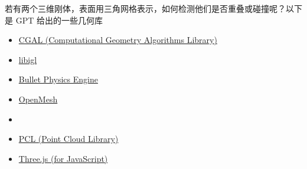 

\begin{issues}
\issueDraft
\end{issues}

若有两个三维刚体，表面用三角网格表示，如何检测他们是否重叠或碰撞呢？以下是 GPT 给出的一些几何库

\begin{itemize}
\item \href{https://www.cgal.org/}{CGAL (Computational Geometry Algorithms Library)}
\item \href{https://libigl.github.io/}{libigl}
\item \href{https://pybullet.org/wordpress/}{Bullet Physics Engine}
\item \href{https://www.graphics.rwth-aachen.de/software/openmesh/}{OpenMesh}
\item {}
\item \href{https://pointclouds.org/}{PCL (Point Cloud Library)}
\item \href{https://threejs.org/}{Three.js (for JavaScript)}
\end{itemize}
